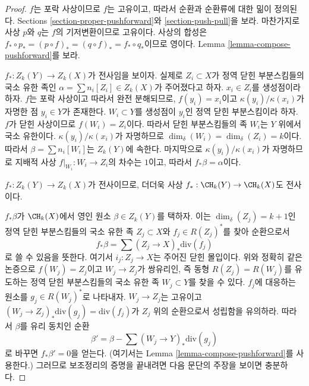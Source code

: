 \begin{proof}
$f$는 포락 사상이므로 $f$는 고유이고, 따라서 순환과 순환류에 대한 밂이
정의된다. Sections \ref{section-proper-pushforward}와
\ref{section-push-pull}을 보라. 마찬가지로 사상 $p$와 $q$는 $f$의
기저변환이므로 고유이다. 사상의 합성은
$f_* \circ p_* = (p \circ f)_* = (q \circ f)_* = f_* \circ q_*$이므로
영이다. Lemma \ref{lemma-compose-pushforward}를 보라.

\medskip\noindent
$f_* : Z_k(Y) \to Z_k(X)$가 전사임을 보이자. 실제로
$Z_i \subset X$가 정역 닫힌 부분스킴들의 국소 유한 족인
$\alpha = \sum n_i[Z_i] \in Z_k(X)$가 주어졌다고 하자.
$x_i \in Z_i$를 생성점이라 하자. $f$는 포락 사상이고 따라서 완전
분해되므로, $f(y_i) = x_i$이고 $\kappa(y_i)/\kappa(x_i)$가 자명한
점 $y_i \in Y$가 존재한다. $W_i \subset Y$를 생성점이 $y_i$인 정역
닫힌 부분스킴이라 하자. $f$가 닫힌 사상이므로 $f(W_i) = Z_i$이다.
따라서 닫힌 부분스킴들의 족 $W_i$는 $Y$ 위에서 국소 유한이다.
$\kappa(y_i)/\kappa(x_i)$가 자명하므로
$\dim_\delta(W_i) = \dim_\delta(Z_i) = k$이다. 따라서
$\beta = \sum n_i[W_i]$는 $Z_k(Y)$에 속한다. 마지막으로
$\kappa(y_i)/\kappa(x_i)$가 자명하므로 지배적 사상
$f|_{W_i} : W_i \to Z_i$의 차수는 $1$이고, 따라서
$f_*\beta = \alpha$이다.

\medskip\noindent
$f_* : Z_k(Y) \to Z_k(X)$가 전사이므로, 더더욱 사상
$f_* : \CH_k(Y) \to \CH_k(X)$도 전사이다.

\medskip\noindent
$f_*\beta$가 $\CH_k(X)$에서 영인 원소 $\beta \in Z_k(Y)$를 택하자.
이는 $\dim_\delta(Z_j) = k + 1$인 정역 닫힌 부분스킴들의 국소 유한 족
$Z_j \subset X$와 $f_j \in R(Z_j)^*$를 찾아 순환으로서
$$
f_*\beta = \sum (Z_j \to X)_*\text{div}(f_j)
$$
로 쓸 수 있음을 뜻한다. 여기서 $i_j : Z_j \to X$는 주어진 닫힌
몰입이다. 위와 정확히 같은 논증으로 $f(W_j) = Z_j$이고
$W_j \to Z_j$가 쌍유리인, 즉 동형
$R(Z_j) = R(W_j)$를 유도하는 정역 닫힌 부분스킴들의 국소 유한 족
$W_j \subset Y$를 찾을 수 있다. $f_j$에 대응하는 원소를
$g_j \in R(W_j)^*$로 나타내자. $W_j \to Z_j$는 고유이고
$(W_j \to Z_j)_*\text{div}(g_j) = \text{div}(f_j)$가 $Z_j$ 위의
순환으로서 성립함을 유의하라. 따라서 $\beta$를 유리 동치인 순환
$$
\beta' = \beta - \sum (W_j \to Y)_*\text{div}(g_j)
$$
로 바꾸면 $f_*\beta' = 0$을 얻는다.
(여기서는 Lemma \ref{lemma-compose-pushforward}를 사용한다.)
그러므로 보조정리의 증명을 끝내려면 다음 문단의 주장을 보이면 충분하다.


\end{proof}
